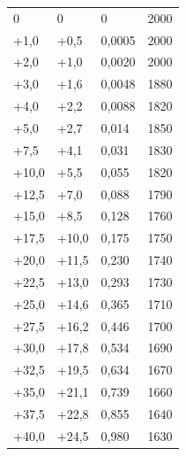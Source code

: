 \documentclass{scrartcl}
\begin{document}
\begin{table}[H]
\begin{center}
\begin{tabular}{l|l|l|l}
0       &   0       &   0       &   2000 \\
+1,0    &   +0,5    &   0,0005  &   2000 \\
+2,0    &   +1,0    &   0,0020  &   2000 \\
+3,0    &   +1,6    &   0,0048  &   1880 \\
+4,0    &   +2,2    &   0,0088  &   1820 \\
+5,0    &   +2,7    &   0,014   &   1850 \\
+7,5    &   +4,1    &   0,031   &   1830 \\
+10,0   &   +5,5    &   0,055   &   1820 \\
+12,5   &   +7,0    &   0,088   &   1790 \\
+15,0   &   +8,5    &   0,128   &   1760 \\
+17,5   &   +10,0   &   0,175   &   1750 \\
+20,0   &   +11,5   &   0,230   &   1740 \\
+22,5   &   +13,0   &   0,293   &   1730 \\
+25,0   &   +14,6   &   0,365   &   1710 \\
+27,5   &   +16,2   &   0,446   &   1700 \\
+30,0   &   +17,8   &   0,534   &   1690 \\
+32,5   &   +19,5   &   0,634   &   1670 \\
+35,0   &   +21,1   &   0,739   &   1660 \\
+37,5   &   +22,8   &   0,855   &   1640 \\
+40,0   &   +24,5   &   0,980   &   1630 
\end{tabular}
\end{center}
\label{tab:Kohlefadenlampe}
\end{table}
\end{document}
